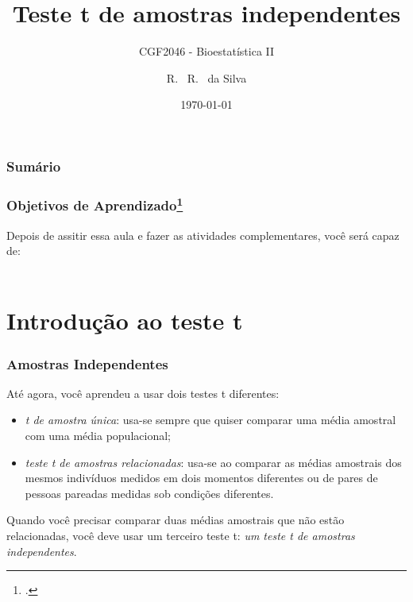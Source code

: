 \documentclass[11pt]{beamer}
\title[Bioestatística II] %
{Teste t de amostras independentes}
\subtitle{CGF2046 - Bioestatística II}
\author[da Silva, Ricardo] %
{R. ~R. ~da Silva\inst{1}}
\institute[FCFRP] %
{
  \inst{1}%
  Departamento de Ciências BioMoleculares\\
  Faculdade de Ciências Farmacêuticas

}
\date{\today} %
\begin{document}


\begin{frame}
\titlepage
\end{frame}

\begin{frame}
\label{contents}
\frametitle{Sumário}
\tableofcontents
\end{frame}

\begin{frame}
\frametitle{Objetivos de Aprendizado\footcite{carlson2017introduction}}
  Depois de assitir essa aula e fazer as atividades complementares, você será capaz de:
  \\~\\
  \begin{itemize}
  \end{itemize}
\end{frame}

\section{Introdução ao teste t}
\begin{frame}
\frametitle{Amostras Independentes}
Até agora, você aprendeu a usar dois testes t diferentes: 

\begin{itemize}
\item \textit{t de amostra única}: usa-se sempre que quiser comparar uma média amostral com uma média populacional;
\item \textit{teste t de amostras relacionadas}: usa-se ao comparar as médias amostrais dos mesmos indivíduos medidos em dois momentos diferentes ou de pares de pessoas pareadas medidas sob condições diferentes.
\end{itemize}
Quando você precisar comparar duas médias amostrais que não estão relacionadas, você deve usar um terceiro teste t: \textit{um teste t de amostras independentes}.

\end{frame}
\end{document}
